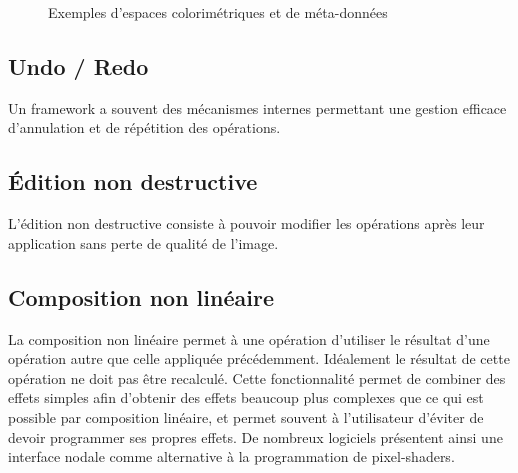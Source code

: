 			\begin{figure}[h]
				\centering
				\caption{Exemples d'espaces colorimétriques et de méta-données}
				\label{fig:color}
			\end{figure}

		\subsection{Undo / Redo}
			Un framework a souvent des mécanismes internes permettant une gestion efficace d'annulation et de répétition des opérations.
		\subsection{Édition non destructive}
			L'édition non destructive consiste à pouvoir modifier les opérations après leur application sans perte de qualité de l'image.
		\subsection{Composition non linéaire}
			La composition non linéaire permet à une opération d'utiliser le résultat d'une opération autre que celle appliquée précédemment. Idéalement
			le résultat de cette opération ne doit pas être recalculé. Cette fonctionnalité permet de combiner des effets simples afin d'obtenir des
			effets beaucoup plus complexes que ce qui est possible par composition linéaire, et permet souvent à l'utilisateur d'éviter de devoir 
			programmer ses propres effets. De nombreux logiciels présentent ainsi une interface nodale 
			comme alternative à la programmation de pixel-shaders.


